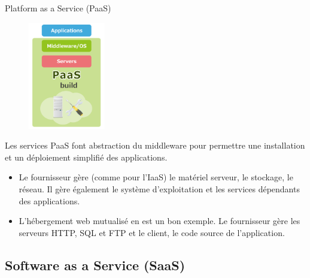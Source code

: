 \documentclass{beamer}
\begin{document}
\begin{frame}{Platform as a Service (PaaS)}
    \begin{figure}
        \centering
        \includegraphics[width=0.30\textwidth]{images/services_paas.png}
    \end{figure}

    Les services PaaS font abstraction du middleware pour permettre une installation
    et un déploiement simplifié des applications.
    \pause

    \begin{itemize}
        \item {
        Le fournisseur gère (comme pour l'IaaS) le matériel serveur, le stockage, le réseau.
        Il gère également le système d'exploitation et les services dépendants des applications.
        }\pause
        \item {
        L'hébergement web mutualisé en est un bon exemple. Le fournisseur gère les serveurs HTTP,
        SQL et FTP et le client, le code source de l'application.
        }
    \end{itemize}
\end{frame}

\subsection{Software as a Service (SaaS)}
\end{document}
